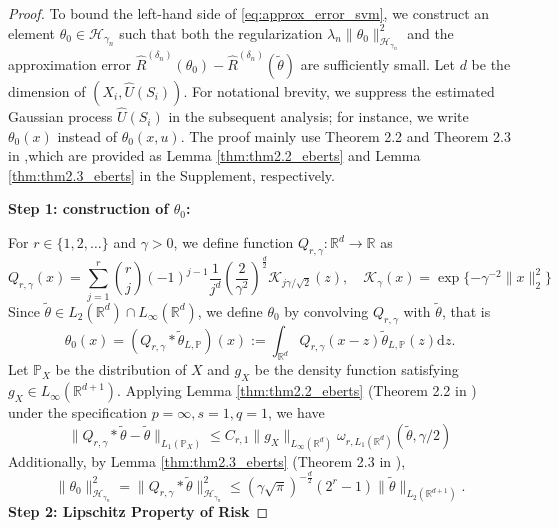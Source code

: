 \documentclass[12pt]{article}
\newcommand{\R}{\mathbb{R}}
\newcommand{\pr}{\mathbb{P}}
\begin{document}
\begin{proof}
\noindent To bound the left-hand side of \eqref{eq:approx_error_svm}, we construct an element  $\theta_0\in\mathcal{H}_{\gamma_n}$ such that both the regularization $\lambda_n\|\theta_0\|^2_{\mathcal{H}_{\gamma_n}}$ and the approximation error $\widehat R^{({\delta_n})}(\theta_0) -\widehat R^{({\delta_n})}(\tilde\theta)$ are sufficiently small. Let $d$ be the dimension of $(X_i,\widehat U(S_i))$. For notational brevity, we suppress the estimated Gaussian process $\widehat{U}(S_i)$ in the subsequent analysis; for instance, we write $\theta_0(x)$ instead of $\theta_0(x, u)$. The proof mainly use Theorem 2.2 and Theorem 2.3 in \citet{SVM2013},which are provided as Lemma \ref{thm:thm2.2_eberts} and Lemma \ref{thm:thm2.3_eberts} in the Supplement, respectively.

\noindent \textbf{Step 1: construction of $\theta_0$:}

\noindent For $r\in\{1,2,\ldots\}$ and $\gamma>0$, we define function $Q_{r,\gamma}: \mathbb{R}^d \to \mathbb{R}$ as
\begin{equation} \label{eq:eberts_Q_r}
Q_{r,\gamma}(x) = \sum_{j=1}^r \binom{r}{j}(-1)^{j-1} \frac{1}{j^d} \left(\frac{2}{\gamma^2}\right)^{\frac{d}{2}} \mathcal{K}_{j\gamma/\sqrt{2}}(z), \quad \mathcal{K}_{\gamma}(x) = \exp\{-\gamma^{-2} \|x\|_2^2\}
\end{equation}
Since $\tilde\theta \in L_2(\mathbb{R}^d) \cap L_\infty(\mathbb{R}^d)$, we define $\theta_0$ by convolving $Q_{r,\gamma}$ with $\tilde\theta$, that is
\[
\theta_0(x) = (Q_{r,\gamma} * \tilde\theta_{L,\pr})(x) := \int_{\mathbb{R}^d} Q_{r,\gamma}(x - z) \tilde\theta_{L,\pr}(z) \mathrm{d}z.
\]
Let $\pr_X$ be the distribution of $X$ and $g_X$ be the density function satisfying $g_X\in L_\infty(\R^{d+1})$. Applying Lemma \ref{thm:thm2.2_eberts} (Theorem 2.2 in \citet{SVM2013}) under the specification $p=\infty,s=1,q=1$, we have
\begin{equation}\label{eq:approx_error_excess_risk}
    \|Q_{r,\gamma} * \tilde\theta - \tilde\theta\|_{L_1(\pr_X)} \le C_{r,1} \|g_X\|_{L_\infty(\mathbb{R}^d)} \omega_{r,L_{1}(\mathbb{R}^d)}(\tilde\theta, \gamma/2)
\end{equation}
Additionally, by Lemma \ref{thm:thm2.3_eberts} (Theorem 2.3 in \citet{SVM2013}), 
\begin{equation}\label{eq:approx_error_regularizer}
    \|\theta_0\|^2_{\mathcal{H}_{\gamma_n}} = \|Q_{r,\gamma} * \tilde\theta\|^2_{\mathcal{H}_{\gamma_n}}\leq (\gamma\sqrt{\pi})^{-\frac{d}{2}}(2^r-1)\|\tilde\theta\|_{L_2(\R^{d+1})}.
\end{equation}
\noindent \textbf{Step 2: Lipschitz Property of Risk}


\end{proof}
\end{document}
